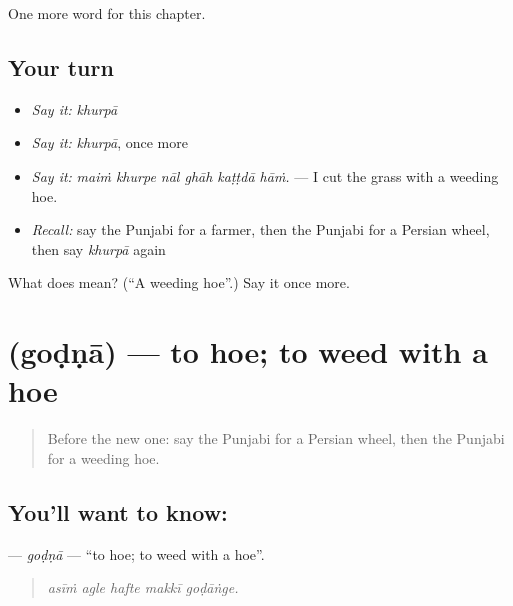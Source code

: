 \begin{grammarlens}[title={What you've built}]
One more word for this chapter.
\end{grammarlens}

\subsection*{Your turn}
\begin{itemize}
\raggedright
  \item \emph{Say it:} \emph{khurpā}
  \item \emph{Say it:} \emph{khurpā}, once more
  \item \emph{Say it:} \emph{maiṁ khurpe nāl ghāh kaṭṭdā hāṁ.} — I cut the grass with a weeding hoe.
  \item \emph{Recall:} say the Punjabi for a farmer, then the Punjabi for a Persian wheel, then say \emph{khurpā} again
\end{itemize}

\begin{tcolorbox}[breakable,colback=teal!4,colframe=teal!35!black,title={Before you move on}]
What does  mean? (\textquotedblleft{}A weeding hoe\textquotedblright{}.) Say it once more.
\end{tcolorbox}
\section[\texorpdfstring{\pa{ਗੋਡਣਾ} (goḍṇā)}{ਗੋਡਣਾ (goḍṇā)}]{ (goḍṇā) — to hoe; to weed with a hoe}

\label{lesson:PA-C304-godna}



\begin{quote}
Before the new one: say the Punjabi for a Persian wheel, then the Punjabi for a weeding hoe.
\end{quote}

\subsection*{You'll want to know: }
\textbf{} — \emph{goḍṇā} — \textquotedblleft{}to hoe; to weed with a hoe\textquotedblright{}.

\begin{quote}
    
\end{quote}

\begin{quote}
\emph{asīṁ agle hafte makkī goḍāṅge.}
\end{quote}

